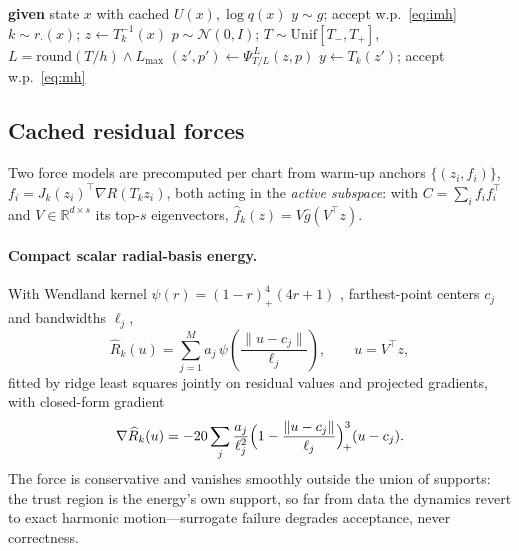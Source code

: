 \documentclass[11pt]{article}
\theoremstyle{remark}
\newcommand{\R}{\mathbb{R}}
\begin{document}
\begin{algorithm}[t]
\caption{Production transition (frozen atlas)}\label{alg:prod}
\begin{algorithmic}[1]
\State \textbf{given} state $x$ with cached $U(x),\log q(x)$
  \State $y\sim g$; accept w.p.\ \eqref{eq:imh}
\Else
  \State $k\sim r_\cdot(x)$;\; $z\gets T_k^{-1}(x)$
  \State $p\sim\mathcal N(0,I)$;\; $T\sim\mathrm{Unif}[T_-,T_+]$,
    $L=\mathrm{round}(T/h)\wedge L_{\max}$
  \State $(z',p')\gets\Psi_{T/L}^{\,L}(z,p)$ 
  \State $y\gets T_k(z')$; accept w.p.\ \eqref{eq:mh}
\EndIf
\end{algorithmic}
\end{algorithm}

\subsection{Cached residual forces}\label{sec:surrogate}
Two force models are precomputed per chart from warm-up anchors
$\{(z_i,f_i)\}$, $f_i=J_k(z_i)^\top\nabla R(T_kz_i)$, both acting in the
\emph{active subspace}: with $C=\sum_if_if_i^\top$ and $V\in\R^{d\times s}$
its top-$s$ eigenvectors, $\hat f_k(z)=V\hat g(V^\top z)$.

\paragraph{Compact scalar radial-basis energy.} With Wendland kernel
$\psi(r)=(1-r)_+^4(4r+1)$ \citep{wendland1995}, farthest-point centers
$c_j$ and bandwidths $\ell_j$,
\begin{equation}
\widehat R_k(u)=\sum_{j=1}^M a_j\,
\psi\!\left(\frac{\lVert u-c_j\rVert}{\ell_j}\right),
\qquad u=V^\top z,
\label{eq:rbf}
\end{equation}
fitted by ridge least squares jointly on residual values and projected
gradients, with closed-form gradient
\begin{equation}
\nabla\widehat R_k(u)
=-20\sum_j\frac{a_j}{\ell_j^2}
\Bigl(1-\frac{\lVert u-c_j\rVert}{\ell_j}\Bigr)_{\!+}^{3}(u-c_j).
\label{eq:rbfgrad}
\end{equation}
The force is conservative and vanishes smoothly outside the union of
supports: the trust region is the energy's own support, so far from data
the dynamics revert to exact harmonic motion---surrogate failure degrades
acceptance, never correctness.
\end{document}
